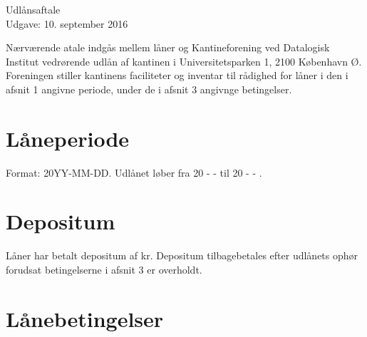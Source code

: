 \documentclass[a4paper]{article}
\begin{document}
\begin{center}
\Huge Udlånsaftale\\
\small Udgave: 10. september 2016
\end{center}

Nærværende atale indgås mellem låner og Kantineforening ved Datalogisk Institut
vedrørende udlån af kantinen i Universitetsparken 1, 2100 København Ø.
Foreningen stiller kantinens faciliteter og inventar til rådighed for låner i
den i afsnit 1 angivne periode, under de i afsnit 3 angivnge betingelser.


\section{Låneperiode}

Format: 20YY-MM-DD.  Udlånet løber fra  20 \underline{\hspace{1cm}} -
\underline{\hspace{1cm}} - \underline{\hspace{1cm}} til 20 \underline{\hspace{1cm}} -
\underline{\hspace{1cm}} - \underline{\hspace{1cm}}.


\section{Depositum}

Låner har betalt depositum af \underline{\hspace{2cm}} kr.  Depositum
tilbagebetales efter udlånets ophør forudsat betingelserne i afsnit 3 er
overholdt.


\section{Lånebetingelser}
\end{document}
